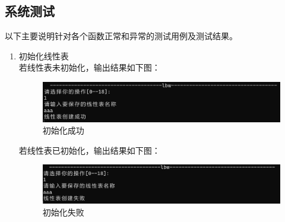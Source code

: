 \documentclass[supercite]{Experimental_Report}
\theoremstyle{definition}
\begin{document}
\subsection{系统测试}
以下主要说明针对各个函数正常和异常的测试用例及测试结果。
	\begin{enumerate}
		\item 初始化线性表\\
		若线性表未初始化，输出结果如下图：
			\begin{figure}[H]
			\centering
			\includegraphics[width=1\linewidth]{images/初始化成功.png}
			\caption{初始化成功}
			\label{fig1-8}
		\end{figure}
	若线性表已初始化，输出结果如下图：
	\begin{figure}[H]
		\centering
		\includegraphics[width=1\linewidth]{images/初始化失败.png}
		\caption{初始化失败}
		\label{fig1-9}
	\end{figure}


\end{enumerate}
\end{document}

